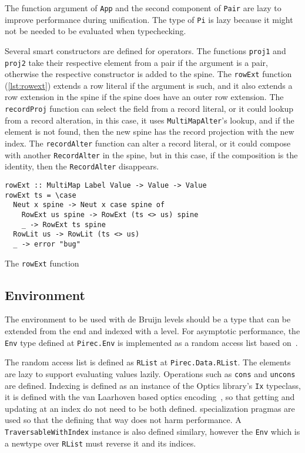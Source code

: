 The function argument of \texttt{App} and the second component of
\texttt{Pair} are lazy to improve performance during unification. The type
of \texttt{Pi} is lazy because it might not be needed to be evaluated when
typechecking.

Several smart constructors are defined for operators. The functions
\texttt{proj1} and \texttt{proj2} take their respective element
from a pair if the argument is a pair, otherwise the respective constructor is
added to the spine. The \texttt{rowExt} function (\cref{lst:rowext})
extends a row literal if the argument is such, and it also extends a row
extension in the spine if the spine does have an outer row extension. The
\texttt{recordProj} function can select the field from a record literal,
or it could lookup from a record alteration, in this case, it uses
\texttt{MultiMapAlter}'s lookup, and if the element is not found, then
the new spine has the record projection with the new index. The
\texttt{recordAlter} function can alter a record literal, or it could
compose with another \texttt{RecordAlter} in the spine, but in this
case, if the composition is the identity, then the \texttt{RecordAlter}
disappears.

\begin{listing}
  \begin{verbatim}
rowExt :: MultiMap Label Value -> Value -> Value
rowExt ts = \case
  Neut x spine -> Neut x case spine of
    RowExt us spine -> RowExt (ts <> us) spine
    _ -> RowExt ts spine
  RowLit us -> RowLit (ts <> us)
  _ -> error "bug"
\end{verbatim}
\caption{The \texttt{rowExt} function}\label{lst:rowext}
\end{listing}

\subsection{Environment}\label{ssec:env}

The environment to be used with de Bruijn levels should be a type that can be
extended from the end and indexed with a level. For asymptotic performance, the
\texttt{Env} type defined at \texttt{Pirec.Env} is implemented as a
random access list based on~\cite{funcdata}.

The random access list is defined as \texttt{RList} at
\texttt{Pirec.Data.RList}. The elements are lazy to support evaluating values
lazily. Operations such as \texttt{cons} and \texttt{uncons} are
defined. Indexing is defined as an instance of the Optics library's
\texttt{Ix} typeclass, it is defined with the van Laarhoven based optics
encoding~\cite{vanlaarhoven}, so that getting and updating at an index do not
need to be both defined.  specialization pragmas are used so that the
defining that way does not harm performance. A
\texttt{TraversableWithIndex} instance is also defined similary, however
the \texttt{Env} which is a newtype over \texttt{RList} must
reverse it and its indices.

